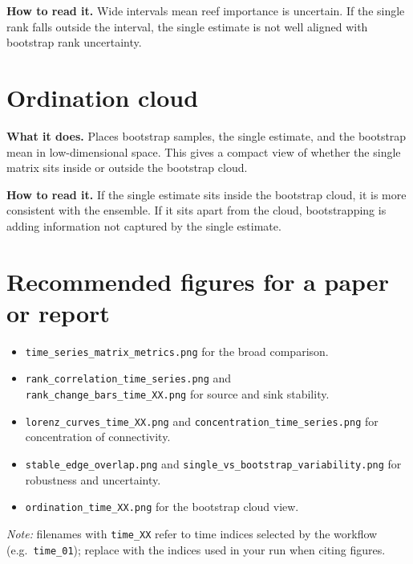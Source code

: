 \documentclass[11pt,a4paper]{article}
\begin{document}
\textbf{How to read it.} Wide intervals mean reef importance is uncertain.
If the single rank falls outside the interval, the single estimate is not well aligned with bootstrap rank uncertainty.

\section{Ordination cloud}

\textbf{What it does.} Places bootstrap samples, the single estimate, and the bootstrap mean in low-dimensional space.
This gives a compact view of whether the single matrix sits inside or outside the bootstrap cloud.


\textbf{How to read it.} If the single estimate sits inside the bootstrap cloud, it is more consistent with the ensemble.
If it sits apart from the cloud, bootstrapping is adding information not captured by the single estimate.

\section{Recommended figures for a paper or report}

\begin{itemize}
  \item \texttt{time\_series\_matrix\_metrics.png} for the broad comparison.
  \item \texttt{rank\_correlation\_time\_series.png} and\\ \texttt{rank\_change\_bars\_time\_XX.png} for source and sink stability.
  \item \texttt{lorenz\_curves\_time\_XX.png} and \texttt{concentration\_time\_series.png} for concentration of connectivity.
  \item \texttt{stable\_edge\_overlap.png} and \texttt{single\_vs\_bootstrap\_variability.png} for robustness and uncertainty.
  \item \texttt{ordination\_time\_XX.png} for the bootstrap cloud view.
\end{itemize}

\noindent
\textit{Note:} filenames with \texttt{time\_XX} refer to time indices selected by the workflow (e.g.\ \texttt{time\_01}); replace with the indices used in your run when citing figures.
\end{document}
